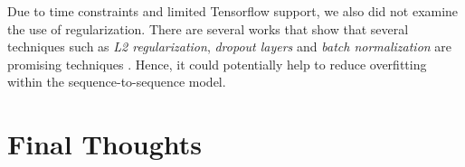 Due to time constraints and limited Tensorflow support, we also did not examine the use of regularization.
There are several works that show that several techniques such as \textit{L2 regularization}, \textit{dropout layers} and \textit{batch normalization} are promising techniques \cite{ioffe2015batch,nielsen_2017}.
Hence, it could potentially help to reduce overfitting within the sequence-to-sequence model.


\section{Final Thoughts}
